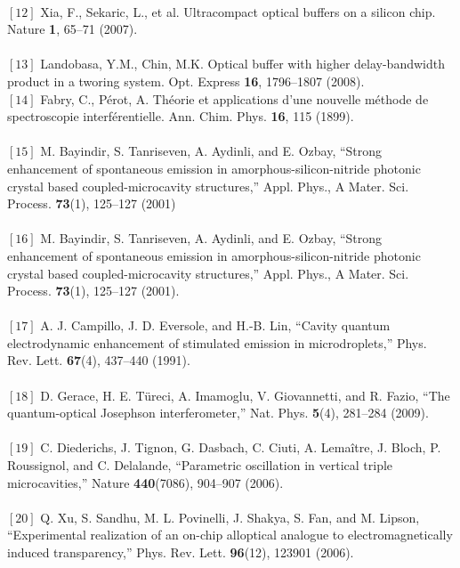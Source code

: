 {\\$[12]$ Xia, F., Sekaric, L., et al. Ultracompact optical buffers on a silicon chip. Nature \textbf{1}, 65–71
(2007).\\
\\$[13]$ Landobasa, Y.M., Chin, M.K. Optical buffer with higher delay-bandwidth product in a tworing system. Opt. Express \textbf{16}, 1796–1807 (2008).
\\$[14]$ Fabry, C., Pérot, A. Théorie et applications d’une nouvelle méthode de spectroscopie interférentielle. Ann. Chim. Phys. \textbf{16}, 115 (1899).\\
\\$[15]$ M. Bayindir, S. Tanriseven, A. Aydinli, and E. Ozbay, “Strong enhancement of spontaneous emission in
amorphous-silicon-nitride photonic crystal based coupled-microcavity structures,” Appl. Phys., A Mater. Sci.
Process. \textbf{73}(1), 125–127 (2001)\\
\\$[16]$ M. Bayindir, S. Tanriseven, A. Aydinli, and E. Ozbay, “Strong enhancement of spontaneous emission in
amorphous-silicon-nitride photonic crystal based coupled-microcavity structures,” Appl. Phys., A Mater. Sci.
Process. \textbf{73}(1), 125–127 (2001).\\
\\$[17]$ A. J. Campillo, J. D. Eversole, and H.-B. Lin, “Cavity quantum electrodynamic enhancement of stimulated
emission in microdroplets,” Phys. Rev. Lett. \textbf{67}(4), 437–440 (1991).\\
\\$[18]$ D. Gerace, H. E. Türeci, A. Imamoglu, V. Giovannetti, and R. Fazio, “The quantum-optical Josephson
interferometer,” Nat. Phys. \textbf{5}(4), 281–284 (2009).\\
\\$[19]$  C. Diederichs, J. Tignon, G. Dasbach, C. Ciuti, A. Lemaître, J. Bloch, P. Roussignol, and C. Delalande,
“Parametric oscillation in vertical triple microcavities,” Nature \textbf{440}(7086), 904–907 (2006).\\
\\$[20]$ Q. Xu, S. Sandhu, M. L. Povinelli, J. Shakya, S. Fan, and M. Lipson, “Experimental realization of an on-chip alloptical analogue to electromagnetically induced transparency,” Phys. Rev. Lett. \textbf{96}(12), 123901 (2006).}

